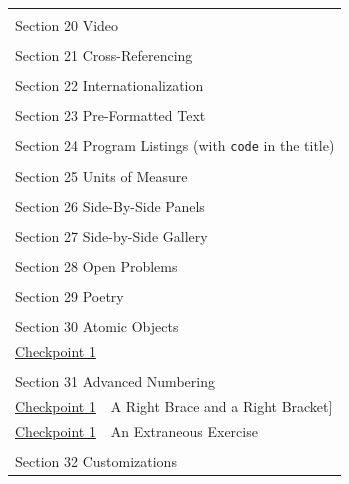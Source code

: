 \documentclass{sn-jnl}
\theoremstyle{thmstyleone}%
\theoremstyle{thmstyletwo}%
\theoremstyle{thmstylethree}%
\newcommand{\mono}[1]{\texttt{#1}}
\numberwithin{equation}{section}
\begin{document}
\begin{appendices}
\begin{longtable}[l]{ll}
\multicolumn{2}{l}{\null}\\[1.5ex] \multicolumn{2}{l}{\large Section 20 Video}\\[0.5ex]
\multicolumn{2}{l}{\null}\\[1.5ex] \multicolumn{2}{l}{\large Section 21 Cross-Referencing}\\[0.5ex]
\multicolumn{2}{l}{\null}\\[1.5ex] \multicolumn{2}{l}{\large Section 22 Internationalization}\\[0.5ex]
\multicolumn{2}{l}{\null}\\[1.5ex] \multicolumn{2}{l}{\large Section 23 Pre-Formatted Text}\\[0.5ex]
\multicolumn{2}{l}{\null}\\[1.5ex] \multicolumn{2}{l}{\large Section 24 Program Listings (with \mono{code} in the title)}\\[0.5ex]
\multicolumn{2}{l}{\null}\\[1.5ex] \multicolumn{2}{l}{\large Section 25 Units of Measure}\\[0.5ex]
\multicolumn{2}{l}{\null}\\[1.5ex] \multicolumn{2}{l}{\large Section 26 Side-By-Side Panels}\\[0.5ex]
\multicolumn{2}{l}{\null}\\[1.5ex] \multicolumn{2}{l}{\large Section 27 Side-by-Side Gallery}\\[0.5ex]
\multicolumn{2}{l}{\null}\\[1.5ex] \multicolumn{2}{l}{\large Section 28 Open Problems}\\[0.5ex]
\multicolumn{2}{l}{\null}\\[1.5ex] \multicolumn{2}{l}{\large Section 29 Poetry}\\[0.5ex]
\multicolumn{2}{l}{\null}\\[1.5ex] \multicolumn{2}{l}{\large Section 30 Atomic Objects}\\[0.5ex]
\hyperref[atomic-image-25]{Checkpoint 1}& \\
\multicolumn{2}{l}{\null}\\[1.5ex] \multicolumn{2}{l}{\large Section 31 Advanced Numbering}\\[0.5ex]
\hyperref[exercise-difficult-title]{Checkpoint 1}& A Right Brace \textbraceright{} and a Right Bracket]\\
\hyperref[section-advanced-numbering-12-2]{Checkpoint 1}& An Extraneous Exercise\\
\multicolumn{2}{l}{\null}\\[1.5ex] \multicolumn{2}{l}{\large Section 32 Customizations}\\[0.5ex]

\end{longtable}
\end{appendices}
\end{document}
